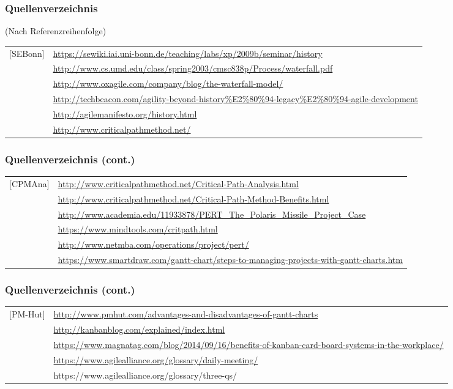 \documentclass[%
	handout
]{beamer}
\newcommand{\sewiki}{[SEBonn]}
\newcommand{\waterfall}{[Royce1970]}
\newcommand{\waterfallmodel}{[OXAgile]}
\newcommand{\tblegacy}{[TBLegacy]}
\newcommand{\agimh}{[AgiHis]}
\newcommand{\cpm}{[CPM]}
\newcommand{\cpa}{[CPMAna]}
\newcommand{\cpb}{[CPMBen]}
\newcommand{\polaris}{[POLARIS]}
\newcommand{\pert}{[CritPath]}
\newcommand{\netmba}{[NetMBA]}
\newcommand{\howtogantt}{[Smartdraw]}
\newcommand{\pmhut}{[PM-Hut]}
\newcommand{\kanban}{[Kanban]}
\newcommand{\magna}{[Magnatag]}
\newcommand{\daily}{[AgileDaily]}
\newcommand{\tq}{[Agile3Q]}
\begin{document}
		\begin{frame}
			\frametitle{Quellenverzeichnis}
			(Nach Referenzreihenfolge)
			\begin{tabular}{rp{.7\framewidth}}
				\sewiki			&	\url{https://sewiki.iai.uni-bonn.de/teaching/labs/xp/2009b/seminar/history} \\
				\waterfall		&	\url{http://www.cs.umd.edu/class/spring2003/cmsc838p/Process/waterfall.pdf}	\\
				\waterfallmodel	&	\url{http://www.oxagile.com/company/blog/the-waterfall-model/}\\
				\tblegacy		&	\url{http://techbeacon.com/agility-beyond-history\%E2\%80\%94-legacy\%E2\%80\%94-agile-development}\\
				\agimh			&	\url{http://agilemanifesto.org/history.html}\\
				\cpm			&	\url{http://www.criticalpathmethod.net/}
			\end{tabular}
		\end{frame}
		
		\begin{frame}
			\frametitle{Quellenverzeichnis (cont.)}
			\begin{tabular}{rp{.7\framewidth}}
				\cpa			&	\url{http://www.criticalpathmethod.net/Critical-Path-Analysis.html}\\
				\cpb			&	\url{http://www.criticalpathmethod.net/Critical-Path-Method-Benefits.html}\\
				\polaris		&	\url{http://www.academia.edu/11933878/PERT\_The\_Polaris\_Missile\_Project\_Case}\\
				\pert			&	\url{https://www.mindtools.com/critpath.html}\\
				\netmba			&	\url{http://www.netmba.com/operations/project/pert/}\\
				\howtogantt		&	\url{https://www.smartdraw.com/gantt-chart/steps-to-managing-projects-with-gantt-charts.htm}
			\end{tabular}
		\end{frame}
		
		\begin{frame}
			\frametitle{Quellenverzeichnis (cont.)}
			\begin{tabular}{rp{.7\framewidth}}
				\pmhut			&	\url{http://www.pmhut.com/advantages-and-disadvantages-of-gantt-charts}\\
				\kanban			&	\url{http://kanbanblog.com/explained/index.html}\\
				\magna			&	\url{https://www.magnatag.com/blog/2014/09/16/benefits-of-kanban-card-board-systems-in-the-workplace/}\\
				\daily			&	\url{https://www.agilealliance.org/glossary/daily-meeting/}\\
				\tq				&	\url{}https://www.agilealliance.org/glossary/three-qs/
			\end{tabular}
		\end{frame}
		
	
\end{document}
